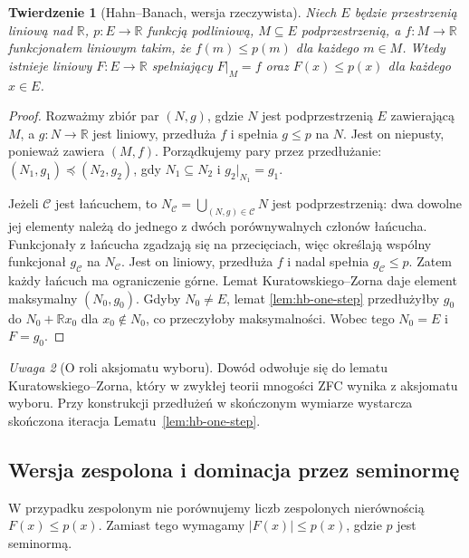 \documentclass[11pt,a4paper]{article}
\numberwithin{equation}{section}
\theoremstyle{plain}
\newtheorem{twierdzenie}{Twierdzenie}[section]
\theoremstyle{definition}
\theoremstyle{remark}
\newtheorem{uwaga}[twierdzenie]{Uwaga}
\newcommand{\R}{\mathbb R}
\begin{document}
\begin{twierdzenie}[Hahn--Banach, wersja rzeczywista]
\label{thm:hb-real}
Niech $E$ będzie przestrzenią liniową nad $\R$,
$p:E\to\R$ funkcją podliniową, $M\subseteq E$ podprzestrzenią,
a $f:M\to\R$ funkcjonałem liniowym takim, że
$f(m)\le p(m)$ dla każdego $m\in M$.
Wtedy istnieje liniowy $F:E\to\R$ spełniający
$F|_M=f$ oraz $F(x)\le p(x)$ dla każdego $x\in E$.
\end{twierdzenie}
\begin{proof}
Rozważmy zbiór par $(N,g)$, gdzie $N$ jest podprzestrzenią
$E$ zawierającą $M$, a $g:N\to\R$ jest liniowy, przedłuża
$f$ i spełnia $g\le p$ na $N$. Jest on niepusty, ponieważ
zawiera $(M,f)$. Porządkujemy pary przez przedłużanie:
$(N_1,g_1)\preceq(N_2,g_2)$, gdy $N_1\subseteq N_2$
i $g_2|_{N_1}=g_1$.

Jeżeli $\mathcal C$ jest łańcuchem, to $N_\mathcal C=
\bigcup_{(N,g)\in\mathcal C}N$ jest podprzestrzenią:
dwa dowolne jej elementy należą do jednego z dwóch
porównywalnych członów łańcucha. Funkcjonały z łańcucha
zgadzają się na przecięciach, więc określają wspólny
funkcjonał $g_\mathcal C$ na $N_\mathcal C$.
Jest on liniowy, przedłuża $f$ i nadal spełnia
$g_\mathcal C\le p$. Zatem każdy łańcuch ma ograniczenie
górne. Lemat Kuratowskiego--Zorna daje element maksymalny
$(N_0,g_0)$. Gdyby $N_0\ne E$, lemat
\ref{lem:hb-one-step} przedłużyłby $g_0$ do
$N_0+\R x_0$ dla $x_0\notin N_0$, co przeczyłoby
maksymalności. Wobec tego $N_0=E$ i $F=g_0$.
\end{proof}

\begin{uwaga}[O roli aksjomatu wyboru]
Dowód odwołuje się do lematu Kuratowskiego--Zorna,
który w zwykłej teorii mnogości ZFC wynika z aksjomatu
wyboru. Przy konstrukcji przedłużeń w skończonym wymiarze
wystarcza skończona iteracja Lematu~\ref{lem:hb-one-step}.
\end{uwaga}

\subsection{Wersja zespolona i dominacja przez seminormę}

W przypadku zespolonym nie porównujemy liczb zespolonych
nierównością $F(x)\le p(x)$. Zamiast tego wymagamy
$|F(x)|\le p(x)$, gdzie $p$ jest seminormą.
\end{document}
